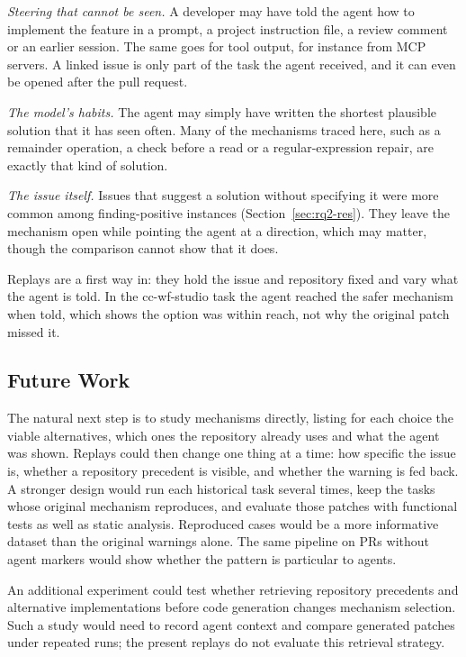 \documentclass[acmsmall,screen,nonacm]{acmart}
\begin{document}
\emph{Steering that cannot be seen.} A developer may have told the agent how to implement the feature in a prompt, a project instruction file, a review comment or an earlier session. The same goes for tool output, for instance from MCP servers. A linked issue is only part of the task the agent received, and it can even be opened after the pull request.

\emph{The model's habits.} The agent may simply have written the shortest plausible solution that it has seen often. Many of the mechanisms traced here, such as a remainder operation, a check before a read or a regular-expression repair, are exactly that kind of solution.

\emph{The issue itself.} Issues that suggest a solution without specifying it were more common among finding-positive instances (Section~\ref{sec:rq2-res}). They leave the mechanism open while pointing the agent at a direction, which may matter, though the comparison cannot show that it does.

Replays are a first way in: they hold the issue and repository fixed and vary what the agent is told. In the cc-wf-studio task the agent reached the safer mechanism when told, which shows the option was within reach, not why the original patch missed it.


\subsection{Future Work}

The natural next step is to study mechanisms directly, listing for each choice the viable alternatives, which ones the repository already uses and what the agent was shown. Replays could then change one thing at a time: how specific the issue is, whether a repository precedent is visible, and whether the warning is fed back. A stronger design would run each historical task several times, keep the tasks whose original mechanism reproduces, and evaluate those patches with functional tests as well as static analysis. Reproduced cases would be a more informative dataset than the original warnings alone. The same pipeline on PRs without agent markers would show whether the pattern is particular to agents.

An additional experiment could test whether retrieving repository precedents and alternative implementations before code generation changes mechanism selection. Such a study would need to record agent context and compare generated patches under repeated runs; the present replays do not evaluate this retrieval strategy.
\end{document}
